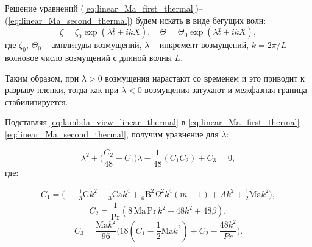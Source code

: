 \documentclass[12pt,a4paper]{article}
\begin{document}
Решение уравнений (\ref{eq:linear_Ma_first_thermal})--(\ref{eq:linear_Ma_second_thermal})  будем искать в виде бегущих волн:
\begin{equation}\label{eq:lambda_view_linear_thermal}
\zeta = \zeta_0 \exp(\lambda \bar{t} + i k X), \quad \Theta = \Theta_0 \exp(\lambda \bar{t} + i k X),
\end{equation}
где $\zeta_0$,  $\Theta_0$ -- амплитуды возмущений, $\lambda$ -- инкремент возмущений, $k=2\pi/L$ -- волновое число возмущений с длиной волны $L$. 

Таким образом, при $\lambda > 0$ возмущения нарастают со временем и это приводит к разрыву пленки, тогда как при $\lambda < 0$ возмущения затухают и межфазная граница стабилизируется.

Подставляя \eqref{eq:lambda_view_linear_thermal} в \eqref{eq:linear_Ma_first_thermal}--\eqref{eq:linear_Ma_second_thermal}, получим уравнение для $\lambda$:

\begin{equation} \label{eq:lambda_Ma_thermal}
	\lambda^2 +\bigg(  \frac{C_2}{48} - C_1 \bigg) \lambda -  \frac{1}{48} (C_1 C_2) + C_3 = 0,
\end{equation}
где:


\begin{align*}
	C_1 =  \bigg(
	& - \frac{1}{3} \mathrm{G} k^2
	- \frac{1}{3} \mathrm{Ca} k^4
	+ \frac{1}{6} \mathrm{B}^2 \Omega^2 k^4 (m-1) + A k^2 + \frac{1}{2} \mathrm{Ma} k^2
	\bigg),
\end{align*}
$$
C_2 = \frac{1}{\mathrm{Pr}} (8 \, \mathrm{Ma} \, \mathrm{Pr} \, k^2 + 48 k^2 + 48 \beta),
$$
$$
C_3 = \frac{\mathrm{Ma} k^2}{96} \bigg(18  (C_1-\frac{1}{2} \mathrm{Ma} k^2) +C_2 - \frac{48 k^2}{Pr}  \bigg) . 
$$
\end{document}

